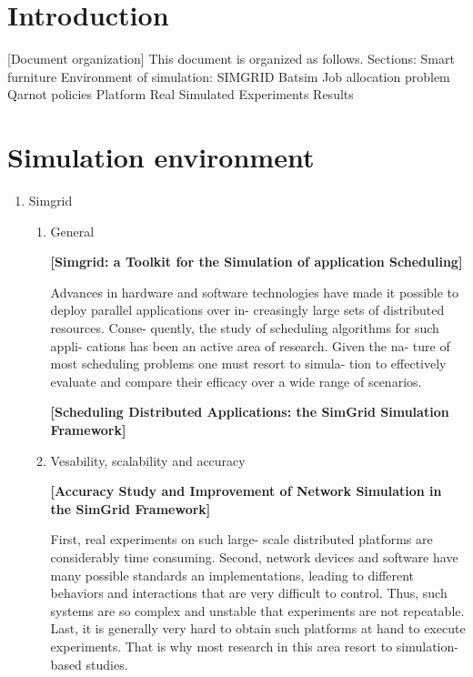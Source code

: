 \documentclass[a4paper,titlepage]{article}
\begin{document}
\tableofcontents

\section{Introduction}
\label{sec-2}

[Document organization]
This document is organized as follows.
Sections:
    Smart furniture
    Environment of simulation:
        SIMGRID
        Batsim
    Job allocation problem
        Qarnot policies
    Platform 
        Real
        Simulated
    Experiments
        Results
\section{Simulation environment}
\label{sec-3}
\begin{enumerate}
\item Simgrid
\label{sec-3-1}
\begin{enumerate}
\item General


\label{sec-3-1-1}
\textbf{[Simgrid: a Toolkit for the Simulation of application Scheduling]}


Advances in hardware and software technologies have
made it possible to deploy parallel applications over in-
creasingly large sets of distributed resources. Conse-
quently, the study of scheduling algorithms for such appli-
cations has been an active area of research. Given the na-
ture of most scheduling problems one must resort to simula-
tion to effectively evaluate and compare their efficacy over
a wide range of scenarios. 

\textbf{[Scheduling Distributed Applications: the SimGrid Simulation Framework]}

\item Vesability, scalability and accuracy


\label{sec-3-1-2}
\textbf{[Accuracy Study and Improvement of Network Simulation in the SimGrid Framework]}

First, real experiments on such large-
scale distributed platforms are considerably time consuming.
Second, network devices and software have many possible
standards an implementations, leading to different behaviors
and interactions that are very difficult to control. Thus, such
systems are so complex and unstable that experiments are
not repeatable. Last, it is generally very hard to obtain such
platforms at hand to execute experiments. That is why most
research in this area resort to simulation-based studies.


\end{enumerate}
\end{enumerate}
\end{document}
